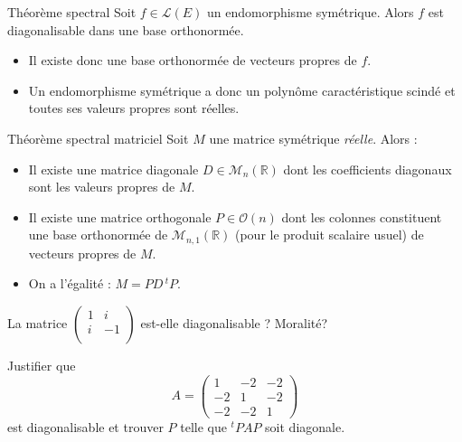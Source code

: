 \documentclass[french,11pt,twoside]{VcCours}
\begin{document}
\begin{Demonstration}{}
\vspace*{5cm}
\end{Demonstration}

\begin{Theoreme}{Théorème spectral}
Soit $f \in \mathcal{L}(E)$ un endomorphisme symétrique. Alors $f$ est diagonalisable dans une base orthonormée.
\end{Theoreme}

\begin{Remarques}{}
\begin{itemize} 
\item Il existe donc une base orthonormée de vecteurs propres de $f$.
\item Un endomorphisme symétrique a donc un polynôme caractéristique scindé et toutes ses valeurs propres sont réelles.
\end{itemize}
\end{Remarques}

\begin{Theoreme}{Théorème spectral matriciel}
Soit $M$ une matrice symétrique \emph{réelle}. Alors :
\begin{itemize}
\item Il existe une matrice diagonale $D \in \mathcal{M}_n(\mathbb{R})$ dont les coefficients diagonaux sont les valeurs propres de $M$.
\item Il existe une matrice orthogonale $P \in \mathcal{O}(n)$ dont les colonnes constituent une base orthonormée de $\mathcal{M}_{n,1}(\mathbb{R})$ (pour le produit scalaire usuel) de vecteurs propres de $M$.
\item On a l'égalité : $M = P D \, ^tP$.
\end{itemize}
\end{Theoreme}

\begin{ApplicationDirecte}{} La matrice $\begin{pmatrix}
1 &i \\
i & -1 \\
\end{pmatrix}$ est-elle diagonalisable ? Moralité?
\end{ApplicationDirecte}

\begin{Exemple}{} Justifier que
  \[
  A =
  \begin{pmatrix}
    1 &  - 2 &  - 2 \\
    - 2 & 1 &  - 2 \\
    - 2 &  - 2 & 1
  \end{pmatrix}
  \]
  est diagonalisable et trouver $P$ telle que $^tPAP$ soit diagonale.

  \newpage

\vspace*{13cm}
\end{Exemple}
\end{document}
